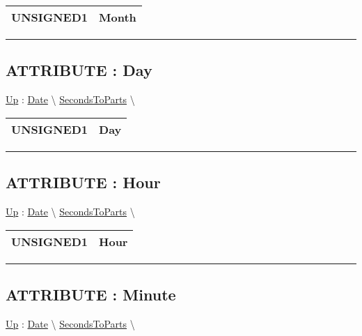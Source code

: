 {\renewcommand{\arraystretch}{1.5}
\begin{tabularx}{\textwidth}{|>{\raggedright\arraybackslash}l|X|}
\hline
\hspace{0pt}UNSIGNED1 & Month \\
\hline
\end{tabularx}
}

\par


\rule{\linewidth}{0.5pt}
\subsection*{ATTRIBUTE : Day}
\hypertarget{ecldoc:date.secondstoparts.result.day}{}
\hyperlink{ecldoc:date.secondstoparts}{Up} :
\hspace{0pt} \hyperlink{ecldoc:Date}{Date} \textbackslash 
\hspace{0pt} \hyperlink{ecldoc:date.secondstoparts}{SecondsToParts} \textbackslash 

{\renewcommand{\arraystretch}{1.5}
\begin{tabularx}{\textwidth}{|>{\raggedright\arraybackslash}l|X|}
\hline
\hspace{0pt}UNSIGNED1 & Day \\
\hline
\end{tabularx}
}

\par


\rule{\linewidth}{0.5pt}
\subsection*{ATTRIBUTE : Hour}
\hypertarget{ecldoc:date.secondstoparts.result.hour}{}
\hyperlink{ecldoc:date.secondstoparts}{Up} :
\hspace{0pt} \hyperlink{ecldoc:Date}{Date} \textbackslash 
\hspace{0pt} \hyperlink{ecldoc:date.secondstoparts}{SecondsToParts} \textbackslash 

{\renewcommand{\arraystretch}{1.5}
\begin{tabularx}{\textwidth}{|>{\raggedright\arraybackslash}l|X|}
\hline
\hspace{0pt}UNSIGNED1 & Hour \\
\hline
\end{tabularx}
}

\par


\rule{\linewidth}{0.5pt}
\subsection*{ATTRIBUTE : Minute}
\hypertarget{ecldoc:date.secondstoparts.result.minute}{}
\hyperlink{ecldoc:date.secondstoparts}{Up} :
\hspace{0pt} \hyperlink{ecldoc:Date}{Date} \textbackslash 
\hspace{0pt} \hyperlink{ecldoc:date.secondstoparts}{SecondsToParts} \textbackslash 

